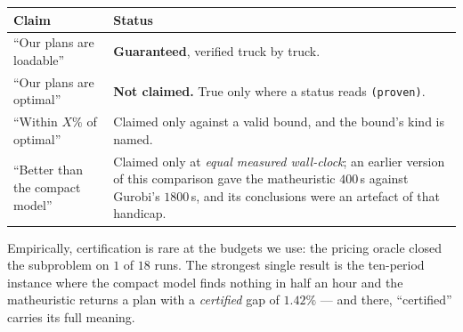 \documentclass[11pt,a4paper]{article}
\begin{document}
\begin{center}
\begin{tabular}{@{}lp{9.6cm}@{}}
\toprule
Claim & Status \\
\midrule
``Our plans are loadable''   & \textbf{Guaranteed}, verified truck by truck. \\
``Our plans are optimal''    & \textbf{Not claimed.} True only where a status reads \texttt{(proven)}. \\
``Within $X\%$ of optimal''  & Claimed only against a valid bound, and the bound's kind is named. \\
``Better than the compact model'' & Claimed only at \emph{equal measured wall-clock}; an earlier version of this comparison gave the matheuristic $400$\,s against Gurobi's $1800$\,s, and its conclusions were an artefact of that handicap. \\
\bottomrule
\end{tabular}
\end{center}

Empirically, certification is rare at the budgets we use: the pricing oracle
closed the subproblem on $1$ of $18$ runs. The strongest single result is the
ten-period instance where the compact model finds nothing in half an hour and
the matheuristic returns a plan with a \emph{certified} gap of $1.42\%$ --- and
there, ``certified'' carries its full meaning.
\end{document}
